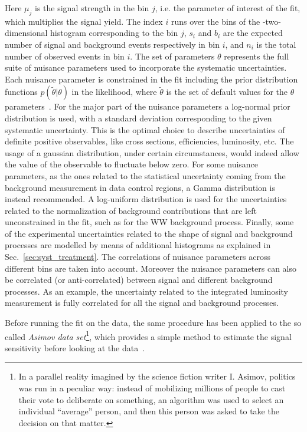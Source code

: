 Here $\mu_j$ is the signal strength in the bin $j$, i.e. the parameter of interest of the fit, which multiplies the signal yield. The index $i$ runs over the bins of the \mll-\mt two-dimensional histogram corresponding to the \pth bin $j$, $s_i$ and $b_i$ are the expected number of signal and background events respectively in bin $i$, and $n_i$ is the total number of observed events in bin $i$. The set of parameters $\theta$ represents the full suite of nuisance parameters used to incorporate the systematic uncertainties. Each nuisance parameter is constrained in the fit including the prior distribution functions $p(\tilde{\theta}|\theta)$ in the likelihood, where $\tilde{\theta}$ is the set of default values for the $\theta$ parameters~\cite{CMS-NOTE-2011-005}. For the major part of the nuisance parameters a log-normal prior distribution is used, with a standard deviation corresponding to the given systematic uncertainty. This is the optimal choice to describe uncertainties of definite positive observables, like cross sections, efficiencies, luminosity, etc. The usage of a gaussian distribution, under certain circumstances, would indeed allow the value of the observable to fluctuate below zero.
For some nuisance parameters, as the ones related to the statistical uncertainty coming from the background measurement in data control regions, a Gamma distribution is instead recommended. 
A log-uniform distribution is used for the uncertainties related to the normalization of background contributions that are left unconstrained in the fit, such as for the WW background process.
Finally, some of the experimental uncertainties related to the shape of signal and background processes are modelled by means of additional histograms as explained in Sec.~\ref{sec:syst_treatment}. The correlations of nuisance parameters across different \pth bins are taken into account. Moreover the nuisance parameters can also be correlated (or anti-correlated) between signal and different background processes. As an example, the uncertainty related to the integrated luminosity measurement is fully correlated for all the signal and background processes.

Before running the fit on the data, the same procedure has been applied to the so called \textit{Asimov data set}\footnote{In a parallel reality imagined by the science fiction writer I. Asimov, politics was run in a peculiar way: instead of mobilizing millions of people to cast their vote to deliberate on something, an algorithm was used to select an individual ``average'' person, and then this person was asked to take the decision on that matter.}, which provides a simple method to estimate the signal sensitivity before looking at the data~\cite{Cowan:2010js}.


